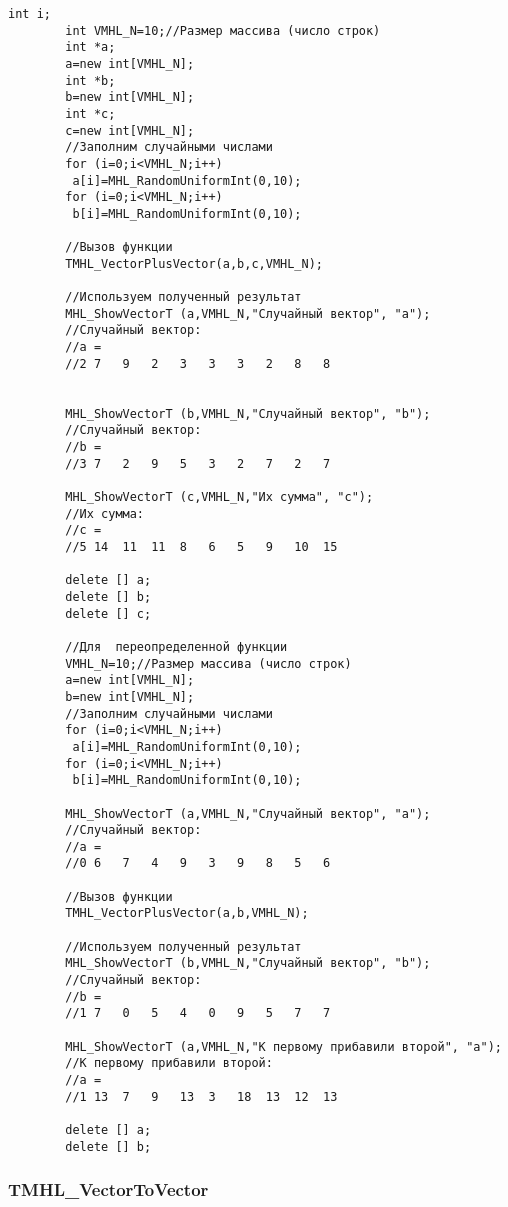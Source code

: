 \documentclass[a4paper,12pt]{article}
\begin{document}
\begin{lstlisting}[label=code_use_TMHL_VectorPlusVector,caption=Пример использования]
        int i;
        int VMHL_N=10;//Размер массива (число строк)
        int *a;
        a=new int[VMHL_N];
        int *b;
        b=new int[VMHL_N];
        int *c;
        c=new int[VMHL_N];
        //Заполним случайными числами
        for (i=0;i<VMHL_N;i++)
         a[i]=MHL_RandomUniformInt(0,10);
        for (i=0;i<VMHL_N;i++)
         b[i]=MHL_RandomUniformInt(0,10);

        //Вызов функции
        TMHL_VectorPlusVector(a,b,c,VMHL_N);

        //Используем полученный результат
        MHL_ShowVectorT (a,VMHL_N,"Случайный вектор", "a");
        //Случайный вектор:
        //a =
        //2	7	9	2	3	3	3	2	8	8


        MHL_ShowVectorT (b,VMHL_N,"Случайный вектор", "b");
        //Случайный вектор:
        //b =
        //3	7	2	9	5	3	2	7	2	7

        MHL_ShowVectorT (c,VMHL_N,"Их сумма", "c");
        //Их сумма:
        //c =
        //5	14	11	11	8	6	5	9	10	15

        delete [] a;
        delete [] b;
        delete [] c;

        //Для  переопределенной функции
        VMHL_N=10;//Размер массива (число строк)
        a=new int[VMHL_N];
        b=new int[VMHL_N];
        //Заполним случайными числами
        for (i=0;i<VMHL_N;i++)
         a[i]=MHL_RandomUniformInt(0,10);
        for (i=0;i<VMHL_N;i++)
         b[i]=MHL_RandomUniformInt(0,10);

        MHL_ShowVectorT (a,VMHL_N,"Случайный вектор", "a");
        //Случайный вектор:
        //a =
        //0	6	7	4	9	3	9	8	5	6

        //Вызов функции
        TMHL_VectorPlusVector(a,b,VMHL_N);

        //Используем полученный результат
        MHL_ShowVectorT (b,VMHL_N,"Случайный вектор", "b");
        //Случайный вектор:
        //b =
        //1	7	0	5	4	0	9	5	7	7

        MHL_ShowVectorT (a,VMHL_N,"К первому прибавили второй", "a");
        //К первому прибавили второй:
        //a =
        //1	13	7	9	13	3	18	13	12	13

        delete [] a;
        delete [] b;
\end{lstlisting}

\subsubsection{TMHL\_VectorToVector}\label{TMHL_VectorToVector}
\end{document}
